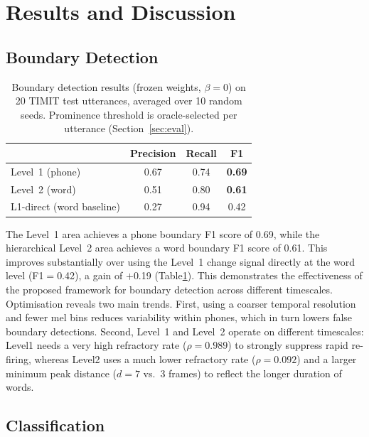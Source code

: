 \section{Results and Discussion}

\subsection{Boundary Detection}

\begin{table}[t]
\caption{Boundary detection results (frozen weights, $\beta{=}0$) on 20 TIMIT test utterances, averaged over 10 random seeds. Prominence threshold is oracle-selected per utterance (Section~\ref{sec:eval}).}
\label{tab:boundary}
\centering
\small
\begin{tabular}{@{}lccc@{}}
\toprule
 & \textbf{Precision} & \textbf{Recall} & \textbf{F1} \\
\midrule
Level~1 (phone) & 0.67 & 0.74 & \textbf{0.69} \\
Level~2 (word) & 0.51 & 0.80 & \textbf{0.61} \\
\midrule
L1-direct (word baseline) & 0.27 & 0.94 & 0.42 \\
\bottomrule
\end{tabular}
\vspace{-10pt}
\end{table}

The Level~1 area achieves a phone boundary F1 score of 0.69, while the hierarchical Level~2 area achieves a word boundary F1 score of 0.61. This improves substantially over using the Level~1 change signal directly at the word level (F1$=$0.42), a gain of $+$0.19 (Table\ref{tab:boundary}). This demonstrates the effectiveness of the proposed framework for boundary detection across different timescales. Optimisation reveals two main trends. First, using a coarser temporal resolution and fewer mel bins reduces variability within phones, which in turn lowers false boundary detections. Second, Level~1 and Level~2 operate on different timescales: Level1 needs a very high refractory rate ($\rho{=}0.989$) to strongly suppress rapid re-firing, whereas Level2 uses a much lower refractory rate ($\rho{=}0.092$) and a larger minimum peak distance ($d{=}7$ vs.\ 3 frames) to reflect the longer duration of words.


\subsection{Classification}

